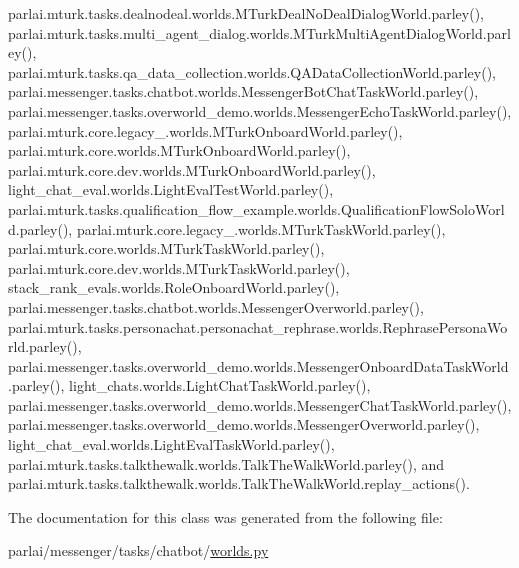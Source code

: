 parlai.\+mturk.\+tasks.\+dealnodeal.\+worlds.\+M\+Turk\+Deal\+No\+Deal\+Dialog\+World.\+parley(), parlai.\+mturk.\+tasks.\+multi\+\_\+agent\+\_\+dialog.\+worlds.\+M\+Turk\+Multi\+Agent\+Dialog\+World.\+parley(), parlai.\+mturk.\+tasks.\+qa\+\_\+data\+\_\+collection.\+worlds.\+Q\+A\+Data\+Collection\+World.\+parley(), parlai.\+messenger.\+tasks.\+chatbot.\+worlds.\+Messenger\+Bot\+Chat\+Task\+World.\+parley(), parlai.\+messenger.\+tasks.\+overworld\+\_\+demo.\+worlds.\+Messenger\+Echo\+Task\+World.\+parley(), parlai.\+mturk.\+core.\+legacy\+\_.\+worlds.\+M\+Turk\+Onboard\+World.\+parley(), parlai.\+mturk.\+core.\+worlds.\+M\+Turk\+Onboard\+World.\+parley(), parlai.\+mturk.\+core.\+dev.\+worlds.\+M\+Turk\+Onboard\+World.\+parley(), light\+\_\+chat\+\_\+eval.\+worlds.\+Light\+Eval\+Test\+World.\+parley(), parlai.\+mturk.\+tasks.\+qualification\+\_\+flow\+\_\+example.\+worlds.\+Qualification\+Flow\+Solo\+World.\+parley(), parlai.\+mturk.\+core.\+legacy\+\_.\+worlds.\+M\+Turk\+Task\+World.\+parley(), parlai.\+mturk.\+core.\+worlds.\+M\+Turk\+Task\+World.\+parley(), parlai.\+mturk.\+core.\+dev.\+worlds.\+M\+Turk\+Task\+World.\+parley(), stack\+\_\+rank\+\_\+evals.\+worlds.\+Role\+Onboard\+World.\+parley(), parlai.\+messenger.\+tasks.\+chatbot.\+worlds.\+Messenger\+Overworld.\+parley(), parlai.\+mturk.\+tasks.\+personachat.\+personachat\+\_\+rephrase.\+worlds.\+Rephrase\+Persona\+World.\+parley(), parlai.\+messenger.\+tasks.\+overworld\+\_\+demo.\+worlds.\+Messenger\+Onboard\+Data\+Task\+World.\+parley(), light\+\_\+chats.\+worlds.\+Light\+Chat\+Task\+World.\+parley(), parlai.\+messenger.\+tasks.\+overworld\+\_\+demo.\+worlds.\+Messenger\+Chat\+Task\+World.\+parley(), parlai.\+messenger.\+tasks.\+overworld\+\_\+demo.\+worlds.\+Messenger\+Overworld.\+parley(), light\+\_\+chat\+\_\+eval.\+worlds.\+Light\+Eval\+Task\+World.\+parley(), parlai.\+mturk.\+tasks.\+talkthewalk.\+worlds.\+Talk\+The\+Walk\+World.\+parley(), and parlai.\+mturk.\+tasks.\+talkthewalk.\+worlds.\+Talk\+The\+Walk\+World.\+replay\+\_\+actions().



The documentation for this class was generated from the following file\+:\begin{DoxyCompactItemize}
\item 
parlai/messenger/tasks/chatbot/\hyperlink{parlai_2messenger_2tasks_2chatbot_2worlds_8py}{worlds.\+py}\end{DoxyCompactItemize}
